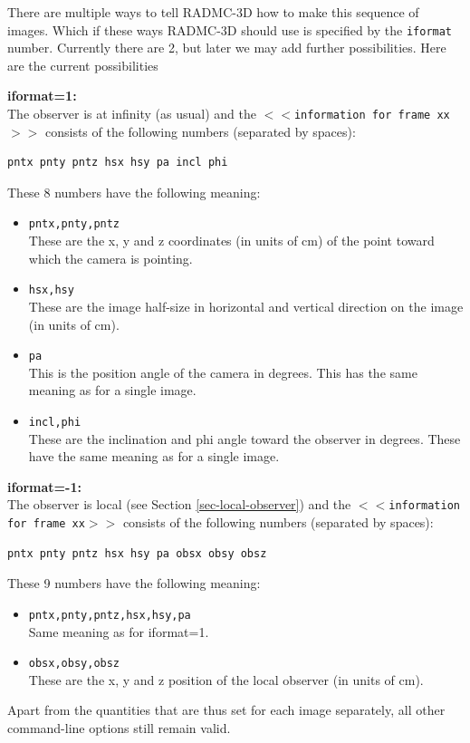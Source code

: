 \documentclass{report}
\newenvironment{asciibox}%
  {\begin{list}{}{%
    \setlength{\topsep}{0.5em}%
    \setlength{\parskip}{0em}%
    \setlength{\parsep}{0em}%
    \setlength{\itemsep}{0em}%
    \setlength{\rightmargin}{0em}%
    \setlength{\leftmargin}{3.0em}%
    \setlength{\labelsep}{1em}%
    \setlength{\labelwidth}{2em}%
  }\normalfont\footnotesize\item}
  {\end{list}}
\begin{document}
There are multiple ways to tell RADMC-3D how to make
this sequence of images. Which if these ways RADMC-3D should use is specified
by the {\small\tt iformat} number. Currently there are 2, but later we may add
further possibilities. Here are the current possibilities
\begin{itemize}
\item {\bf iformat=1:}\\
The observer is at infinity (as usual) and the {\small\tt $<<$information
  for frame xx$>>$} consists of the following numbers (separated by
spaces):
\begin{asciibox}\begin{verbatim}
pntx pnty pntz hsx hsy pa incl phi
\end{verbatim}\end{asciibox}
These 8 numbers have the following meaning:
\begin{itemize}
\item {\small\tt pntx,pnty,pntz}\\
  These are the x, y and z coordinates (in units of cm) of the point toward
  which the camera is pointing.
\item {\small\tt hsx,hsy}\\
  These are the image half-size in horizontal and vertical direction on the
  image (in units of cm). 
\item {\small\tt pa}\\
  This is the position angle of the camera in degrees.
  This has the same meaning as for a single image.
\item {\small\tt incl,phi}\\
  These are the inclination and phi angle toward the observer in degrees.
  These have the same meaning as for a single image.
\end{itemize}
\item {\bf iformat=-1:}\\
 The observer is local (see Section
  \ref{sec-local-observer}) and the {\small\tt $<<$information for frame
    xx$>>$} consists of the following numbers (separated by spaces):
\begin{asciibox}\begin{verbatim}
pntx pnty pntz hsx hsy pa obsx obsy obsz
\end{verbatim}\end{asciibox}
These 9 numbers have the following meaning:
\begin{itemize}
\item {\small\tt pntx,pnty,pntz,hsx,hsy,pa}\\
  Same meaning as for iformat=1.
\item {\small\tt obsx,obsy,obsz}\\
  These are the x, y and z position of the local observer (in units of cm).
\end{itemize}
\end{itemize}
Apart from the quantities that are thus set for each image separately, 
all other command-line options still remain valid. 
\end{document}
